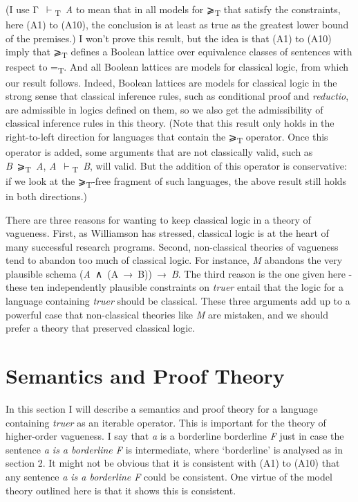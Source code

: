 \documentclass[
  10pt,
  letterpaper,
  DIV=11,
  numbers=noendperiod,
  twoside]{scrartcl}
\begin{document}
(I use Γ~\(\vdash\)\textsubscript{T}~\emph{A} to mean that in all models
for ⩾\textsubscript{T} that satisfy the constraints, here (A1) to (A10),
the conclusion is at least as true as the greatest lower bound of the
premises.) I won't prove this result, but the idea is that (A1) to (A10)
imply that ⩾\textsubscript{T} defines a Boolean lattice over equivalence
classes of sentences with respect to =\textsubscript{T}. And all Boolean
lattices are models for classical logic, from which our result follows.
Indeed, Boolean lattices are models for classical logic in the strong
sense that classical inference rules, such as conditional proof and
\emph{reductio}, are admissible in logics defined on them, so we also
get the admissibility of classical inference rules in this theory. (Note
that this result only holds in the right-to-left direction for languages
that contain the ⩾\textsubscript{T} operator. Once this operator is
added, some arguments that are not classically valid, such as
\emph{B}~⩾\textsubscript{T}~\emph{A},
\emph{A}~\(\vdash\)\textsubscript{T}~\emph{B}, will valid. But the
addition of this operator is conservative: if we look at the
⩾\textsubscript{T}-free fragment of such languages, the above result
still holds in both directions.)

There are three reasons for wanting to keep classical logic in a theory
of vagueness. First, as Williamson has stressed, classical logic is at
the heart of many successful research programs. Second, non-classical
theories of vagueness tend to abandon too much of classical logic. For
instance, \emph{M} abandons the very plausible schema
(\emph{A}~∧~(A~→~B))~→~\emph{B}. The third reason is the one given here
- these ten independently plausible constraints on \emph{truer} entail
that the logic for a language containing \emph{truer} should be
classical. These three arguments add up to a powerful case that
non-classical theories like \emph{M} are mistaken, and we should prefer
a theory that preserved classical logic.

\section{Semantics and Proof Theory}\label{semantics-and-proof-theory}

In this section I will describe a semantics and proof theory for a
language containing \emph{truer} as an iterable operator. This is
important for the theory of higher-order vagueness. I say that \emph{a}
is a borderline borderline \emph{F} just in case the sentence \emph{a is
a borderline F} is intermediate, where `borderline' is analysed as in
section 2. It might not be obvious that it is consistent with (A1) to
(A10) that any sentence \emph{a is a borderline F} could be consistent.
One virtue of the model theory outlined here is that it shows this is
consistent.
\end{document}

